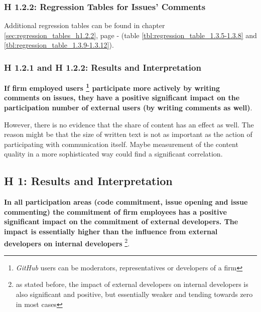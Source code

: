 \begin{landscape}

\subsubsection{H 1.2.2: Regression Tables for Issues' Comments}

Additional regression tables can be found in chapter \ref{sec:regression_tables_h1.2.2}, page \pageref{tbl:regression_table_1.3.5-1.3.8} -  \pageref{tbl:regression_table_1.3.9-1.3.12} (table \ref{tbl:regression_table_1.3.5-1.3.8} and \ref{tbl:regression_table_1.3.9-1.3.12}).

\begin{table}[!h] \centering
  \scriptsize{
	  
  }
	\caption{Impact of participation by content share in issues' comments (Model 1.3.1 - 1.3.2) and number of comments by firm employed users on external users (and v.v.) in all Projects (Model 1.3.3 - 1.3.4)}
	\label{tbl:regression_table_1.3.1-1.3.4}
\end{table}

\end{landscape}

\subsubsection{H 1.2.1 and H 1.2.2: Results and Interpretation}
\label{sec:h1.2_h1.3_results_and_interpretation}

\textbf{If firm employed users \footnote{\textit{GitHub} users can be moderators, representatives or developers of a firm} participate more actively by writing comments on issues, they have a positive significant impact on the participation number of external users (by writing comments as well)}.

However, there is no evidence that the share of content has an effect as well. The reason might be that the size of written text is not as important as the action of participating with communication itself. Maybe measurement of the content quality in a more sophisticated way could find a significant correlation.

\subsection{H 1: Results and Interpretation}

\textbf{In all participation areas (code commitment, issue opening and issue commenting) the commitment of firm employees has a positive significant impact on the commitment of external developers. The impact is essentially higher than the influence from external developers on internal developers} \footnote{as stated before, the impact of external developers on internal developers is also significant and positive, but essentially weaker and tending towards zero in most cases}.


